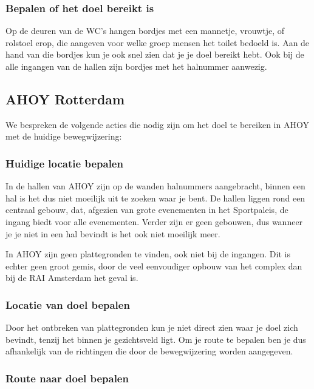 \subsubsection{Bepalen of het doel bereikt is}

Op de deuren van de WC's hangen bordjes met een mannetje, vrouwtje, of rolstoel erop, die aangeven voor welke groep mensen het toilet bedoeld is. Aan de hand van die bordjes kun je ook snel zien dat je je doel bereikt hebt. Ook bij de alle ingangen van de hallen zijn bordjes met het halnummer aanwezig.


\subsection{AHOY Rotterdam}

We bespreken de volgende acties die nodig zijn om het doel te bereiken in AHOY met de huidige bewegwijzering:


\subsubsection{Huidige locatie bepalen}

In de hallen van AHOY zijn op de wanden halnummers aangebracht, binnen een hal is het dus niet moeilijk uit te zoeken waar je bent. De hallen liggen rond een centraal gebouw, dat, afgezien van grote evenementen in het Sportpaleis, de ingang biedt voor alle evenementen. Verder zijn er geen gebouwen, dus wanneer je je niet in een hal bevindt is het ook niet moeilijk meer.

In AHOY zijn geen plattegronden te vinden, ook niet bij de ingangen. Dit is echter geen groot gemis, door de veel eenvoudiger opbouw van het complex dan bij de RAI Amsterdam het geval is.


\subsubsection{Locatie van doel bepalen}

Door het ontbreken van plattegronden kun je niet direct zien waar je doel zich bevindt, tenzij het binnen je gezichtsveld ligt. Om je route te bepalen ben je dus afhankelijk van de richtingen die door de bewegwijzering worden aangegeven.


\subsubsection{Route naar doel bepalen}

